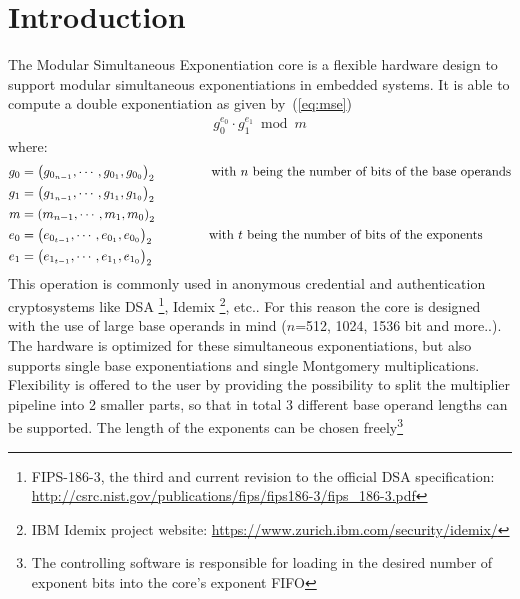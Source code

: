 \chapter{Introduction}
The Modular Simultaneous Exponentiation core is a flexible hardware design to support modular simultaneous exponentiations 
in embedded systems. It is able to compute a double exponentiation as given by~(\ref{eq:mse})
\begin{align}\label{eq:mse}
g_{0}^{e_0} \cdot g_{1}^{e_1} \bmod m
\end{align} 
where:
\begin{align}
	g_{0} &= \left(g_{0_{n-1}}, \cdots, g_{0_{1}}, g_{0_{0}}\right)_{2}\hspace{1.5cm} \text{with } n \text{ being the number of bits of the base operands}\nonumber \\
	g_{1} &= \left(g_{1_{n-1}}, \cdots, g_{1_{1}}, g_{1_{0}}\right)_{2}\nonumber \\
	m &=\left(m_{n-1}, \cdots, m_{1}, m_{0}\right)_{2}\nonumber \\
	e_{0} &=\left(e_{0_{t-1}}, \cdots, e_{0_{1}}, e_{0_{0}}\right)_{2}\hspace{1.5cm} \text{with } t \text{ being the number of bits of the exponents}\nonumber \\
	e_{1} &=\left(e_{1_{t-1}}, \cdots, e_{1_{1}}, e_{1_{0}}\right)_{2}\nonumber
\end{align}
This operation is commonly used in anonymous credential and authentication cryptosystems like DSA \footnote{FIPS-186-3, the third and current revision to the official DSA specification:\\\hspace*{1cm}\url{http://csrc.nist.gov/publications/fips/fips186-3/fips_186-3.pdf}}, Idemix \footnote{IBM Idemix project website: \url{https://www.zurich.ibm.com/security/idemix/}}, etc.. For this reason the core is designed with the use of large base operands in mind ($n$=512, 1024, 1536 bit and more..). The hardware is optimized for these 
simultaneous exponentiations, but also supports single base exponentiations and single Montgomery multiplications.
Flexibility is offered to the user by providing the possibility to split the multiplier pipeline into 2 smaller parts, so that in total 
3 different base operand lengths can be supported. The length of the exponents can be chosen freely\footnote{The controlling software is responsible for loading in the desired number of exponent bits into the core's exponent FIFO}
